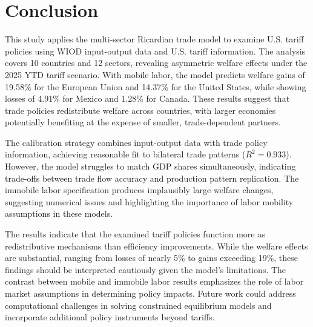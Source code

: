 \section{Conclusion}

This study applies the \cite{costinot2012TheReviewofEconomicStudies} multi-sector Ricardian trade model to examine U.S. tariff policies using WIOD input-output data and U.S. tariff information. The analysis covers 10 countries and 12 sectors, revealing asymmetric welfare effects under the 2025 YTD tariff scenario. With mobile labor, the model predicts welfare gains of 19.58\% for the European Union and 14.37\% for the United States, while showing losses of 4.91\% for Mexico and 1.28\% for Canada. These results suggest that trade policies redistribute welfare across countries, with larger economies potentially benefiting at the expense of smaller, trade-dependent partners.

The calibration strategy combines input-output data with trade policy information, achieving reasonable fit to bilateral trade patterns ($R^2 = 0.933$). However, the model struggles to match GDP shares simultaneously, indicating trade-offs between trade flow accuracy and production pattern replication. The immobile labor specification produces implausibly large welfare changes, suggesting numerical issues and highlighting the importance of labor mobility assumptions in these models.

The results indicate that the examined tariff policies function more as redistributive mechanisms than efficiency improvements. While the welfare effects are substantial, ranging from losses of nearly 5\% to gains exceeding 19\%, these findings should be interpreted cautiously given the model's limitations. The contrast between mobile and immobile labor results emphasizes the role of labor market assumptions in determining policy impacts. Future work could address computational challenges in solving constrained equilibrium models and incorporate additional policy instruments beyond tariffs.
